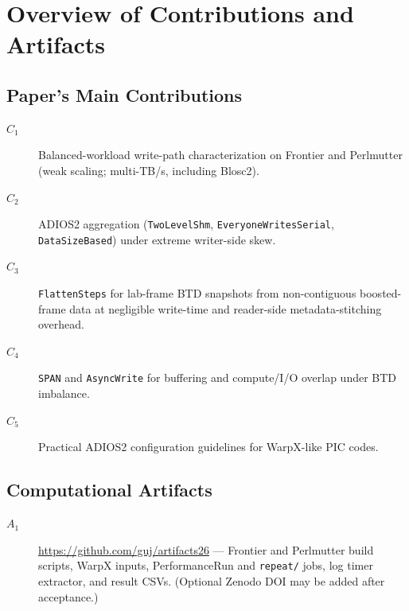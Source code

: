 \documentclass[conference]{IEEEtran}
\begin{document}


\appendixAD

\section{Overview of Contributions and Artifacts}

\subsection{Paper's Main Contributions}

\begin{description}
\item[$C_1$] Balanced-workload write-path characterization on Frontier and
  Perlmutter (weak scaling; multi-TB/s, including Blosc2).
\item[$C_2$] ADIOS2 aggregation (\texttt{TwoLevelShm}, \texttt{EveryoneWritesSerial},
  \texttt{DataSizeBased}) under extreme writer-side skew.
\item[$C_3$] \texttt{FlattenSteps} for lab-frame BTD snapshots from non-contiguous
  boosted-frame data at negligible write-time and reader-side metadata-stitching overhead.
\item[$C_4$] \texttt{SPAN} and \texttt{AsyncWrite} for buffering and compute/I/O
  overlap under BTD imbalance.
\item[$C_5$] Practical ADIOS2 configuration guidelines for WarpX-like PIC codes.
\end{description}

\subsection{Computational Artifacts}

\begin{description}
\item[$A_1$] \url{https://github.com/guj/artifacts26} ---
  Frontier and Perlmutter build scripts, WarpX inputs, PerformanceRun and
  \texttt{repeat/} jobs, log timer extractor, and result CSVs.
  (Optional Zenodo DOI may be added after acceptance.)
\end{description}
\end{document}
